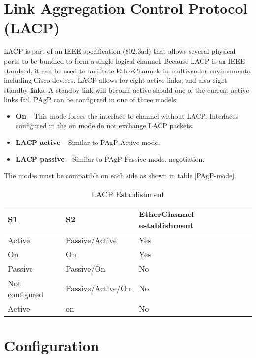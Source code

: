 \section{Link Aggregation Control Protocol (LACP)}
LACP is part of an IEEE specification (802.3ad) that allows several physical ports to be bundled to form a single logical channel. Because LACP is an IEEE standard, it can be used to facilitate EtherChannels in multivendor environments, including Cisco devices. LACP allows for eight active links, and also eight standby links. A standby link will become active should one of the current active links fail.
PAgP can be configured in one of three models:
\begin{itemize}
\item \textbf{On} -- This mode forces the interface to channel without LACP. Interfaces configured in the on mode do not exchange LACP packets.
\item \textbf{LACP active} -- Similar to PAgP Active mode.
\item \textbf{LACP passive} -- Similar to PAgP Passive mode. negotiation.
\end{itemize}
The modes must be compatible on each side as shown in table \ref{PAgP-mode}.
\begin{table}[htbp]
\caption{LACP Establishment}
\label{LACP-mode}
\begin{tabular}{|l|l|l|}
\hline
S1             & S2                & EtherChannel establishment \\ \hline
Active      & Passive/Active    & Yes                        \\ \hline
On             & On                & Yes                        \\ \hline
Passive           & Passive/On           & No                         \\ \hline
Not configured & Passive/Active/On & No                         \\ \hline
Active      & on                & No                         \\ \hline
\end{tabular}
\end{table}

\section{Configuration}